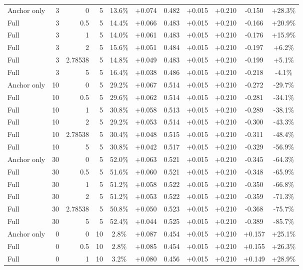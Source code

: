 \begin{table}[htbp]
\begin{tabular}{lrrrccccccc}
Anchor only & 3 & 0 & 5 & 13.6\% & +0.074 & 0.482 & +0.015 & +0.210 & -0.150 & +28.3\% \\
Full & 3 & 0.5 & 5 & 14.4\% & +0.066 & 0.483 & +0.015 & +0.210 & -0.166 & +20.9\% \\
Full & 3 & 1 & 5 & 14.0\% & +0.061 & 0.483 & +0.015 & +0.210 & -0.176 & +15.9\% \\
Full & 3 & 2 & 5 & 15.6\% & +0.051 & 0.484 & +0.015 & +0.210 & -0.197 & +6.2\% \\
Full & 3 & 2.78538 & 5 & 14.8\% & +0.049 & 0.483 & +0.015 & +0.210 & -0.199 & +5.1\% \\
Full & 3 & 5 & 5 & 16.4\% & +0.038 & 0.486 & +0.015 & +0.210 & -0.218 & -4.1\% \\
Anchor only & 10 & 0 & 5 & 29.2\% & +0.067 & 0.514 & +0.015 & +0.210 & -0.272 & -29.7\% \\
Full & 10 & 0.5 & 5 & 29.6\% & +0.062 & 0.514 & +0.015 & +0.210 & -0.281 & -34.1\% \\
Full & 10 & 1 & 5 & 30.8\% & +0.058 & 0.513 & +0.015 & +0.210 & -0.289 & -38.1\% \\
Full & 10 & 2 & 5 & 29.2\% & +0.053 & 0.514 & +0.015 & +0.210 & -0.300 & -43.3\% \\
Full & 10 & 2.78538 & 5 & 30.4\% & +0.048 & 0.515 & +0.015 & +0.210 & -0.311 & -48.4\% \\
Full & 10 & 5 & 5 & 30.8\% & +0.042 & 0.517 & +0.015 & +0.210 & -0.329 & -56.9\% \\
Anchor only & 30 & 0 & 5 & 52.0\% & +0.063 & 0.521 & +0.015 & +0.210 & -0.345 & -64.3\% \\
Full & 30 & 0.5 & 5 & 51.6\% & +0.060 & 0.521 & +0.015 & +0.210 & -0.348 & -65.9\% \\
Full & 30 & 1 & 5 & 51.2\% & +0.058 & 0.522 & +0.015 & +0.210 & -0.350 & -66.8\% \\
Full & 30 & 2 & 5 & 51.2\% & +0.053 & 0.522 & +0.015 & +0.210 & -0.359 & -71.3\% \\
Full & 30 & 2.78538 & 5 & 50.8\% & +0.050 & 0.523 & +0.015 & +0.210 & -0.368 & -75.7\% \\
Full & 30 & 5 & 5 & 52.4\% & +0.044 & 0.525 & +0.015 & +0.210 & -0.389 & -85.7\% \\
Anchor only & 0 & 0 & 10 & 2.8\% & +0.087 & 0.454 & +0.015 & +0.210 & +0.157 & +25.1\% \\
Full & 0 & 0.5 & 10 & 2.8\% & +0.085 & 0.454 & +0.015 & +0.210 & +0.155 & +26.3\% \\
Full & 0 & 1 & 10 & 3.2\% & +0.080 & 0.456 & +0.015 & +0.210 & +0.149 & +28.9\% \\

\end{tabular}
\end{table}
